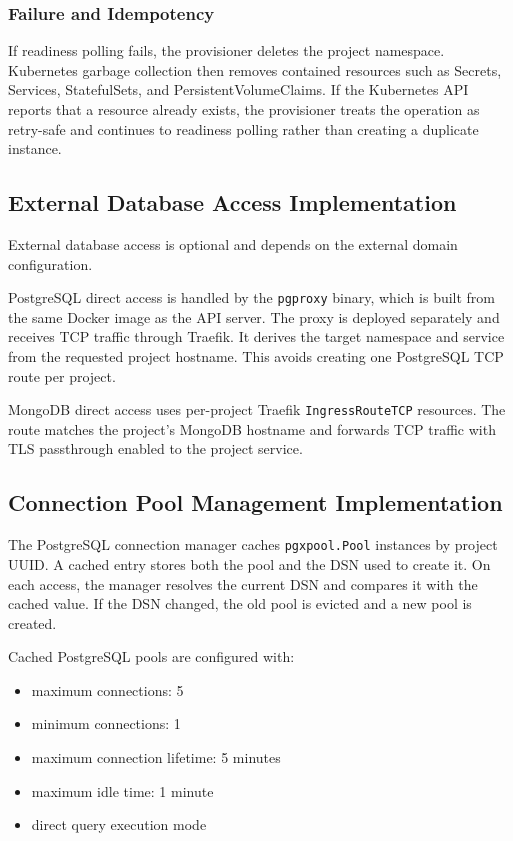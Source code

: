 \subsubsection{Failure and Idempotency}
If readiness polling fails, the provisioner deletes the project namespace. Kubernetes garbage collection then removes contained resources such as Secrets, Services, StatefulSets, and PersistentVolumeClaims. If the Kubernetes API reports that a resource already exists, the provisioner treats the operation as retry-safe and continues to readiness polling rather than creating a duplicate instance.

\subsection{External Database Access Implementation}

External database access is optional and depends on the external domain configuration.

PostgreSQL direct access is handled by the \texttt{pgproxy} binary, which is built from the same Docker image as the API server. The proxy is deployed separately and receives TCP traffic through Traefik. It derives the target namespace and service from the requested project hostname. This avoids creating one PostgreSQL TCP route per project.

MongoDB direct access uses per-project Traefik \texttt{IngressRouteTCP} resources. The route matches the project's MongoDB hostname and forwards TCP traffic with TLS passthrough enabled to the project service.

\subsection{Connection Pool Management Implementation}

The PostgreSQL connection manager caches \texttt{pgxpool.Pool} instances by project UUID. A cached entry stores both the pool and the DSN used to create it. On each access, the manager resolves the current DSN and compares it with the cached value. If the DSN changed, the old pool is evicted and a new pool is created.

Cached PostgreSQL pools are configured with:

\begin{itemize}
    \item maximum connections: 5
    \item minimum connections: 1
    \item maximum connection lifetime: 5 minutes
    \item maximum idle time: 1 minute
    \item direct query execution mode
\end{itemize}

